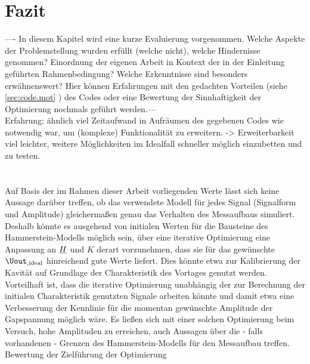 \documentclass[../Report.tex]{subfiles}
\begin{document}
\chapter{Fazit}
\label{chap:fazit}
---- In diesem Kapitel wird eine kurze Evaluierung vorgenommen. Welche Aspekte der Problemstellung wurden erfüllt (welche nicht), welche Hindernisse genommen? Einordnung der eigenen Arbeit in Kontext der in der Einleitung geführten Rahmenbedingung? Welche Erkenntnisse sind besonders erwähnenswert? Hier können Erfahrungen mit den gedachten Vorteilen (siehe \ref{sec:code.mot} ) des Codes oder eine Bewertung der Sinnhaftigkeit der Optimierung nochmals geführt werden.--- 
\\
Erfahrung: ähnlich viel Zeitaufwand in Aufräumen des gegebenen Codes wie notwendig war, um (komplexe) Funktionalität zu erweitern. -> Erweiterbarkeit viel leichter, weitere Möglichkeiten im Idealfall schneller möglich einzubetten und zu testen. 
\\
\\
\\
Auf Basis der im Rahmen dieser Arbeit vorliegenden Werte lässt sich keine Aussage darüber treffen, ob das verwendete Modell für jedes Signal (Signalform und Amplitude) gleichermaßen genau das Verhalten des Messaufbaus simuliert.
Deshalb könnte es ausgehend von initialen Werten für die Bausteine des Hammerstein-Modells möglich sein, über eine iterative Optimierung eine Anpassung an $\underline{H}$ und $K$ derart vorzunehmen, dass sie für das gewünschte $\Uout_{, \mathrm{ideal}}$ hinreichend gute Werte liefert. Dies könnte etwa zur Kalibrierung der Kavität auf Grundlage der Charakteristik des Vortages genutzt werden. Vorteilhaft ist, dass die iterative Optimierung unabhängig der zur Berechnung der initialen Charakteristik genutzten Signale arbeiten könnte und damit etwa eine Verbesserung der Kennlinie für die momentan gewünschte Amplitude der Gapspannung möglich wäre.
Es ließen sich mit einer solchen Optimierung beim Versuch, hohe Amplituden zu erreichen, auch Aussagen über die - falls vorhandenen - Grenzen des Hammerstein-Modells für den Messaufbau treffen.
\\
Bewertung der Zielführung der Optimierung
\end{document}
